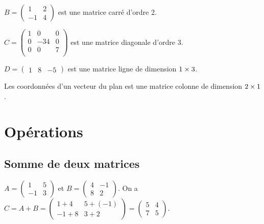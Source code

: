 \documentclass[10pt,a4paper]{article}
\begin{document}
\exes $B=\begin{pmatrix}
1&2 \\
-1&4 
\end{pmatrix}$ est une matrice carré d'ordre 2.

$C=\begin{pmatrix}
1&0&0 \\
0&-34&0 \\
0&0&7 \\ 
\end{pmatrix}$ est une matrice diagonale d’ordre 3.


$D=\begin{pmatrix}
1&8&-5 \end{pmatrix}$ est une matrice ligne de dimension $1 \times 3$.

Les coordonnées d'un vecteur du plan est une matrice colonne de dimension $2 \times 1$.





\section{Opérations}

\subsection{Somme de deux matrices}


\exe $A=\begin{pmatrix} 1&5 \\ -1&3  \end{pmatrix}$ et $B=\begin{pmatrix} 4&-1 \\ 8&2  \end{pmatrix}$. 
On a $C=A+B=\begin{pmatrix} 1+4&5+(-1) \\ -1+8&3+2  \end{pmatrix}=\begin{pmatrix} 5&4 \\ 7&5  \end{pmatrix}$.
\end{document}
